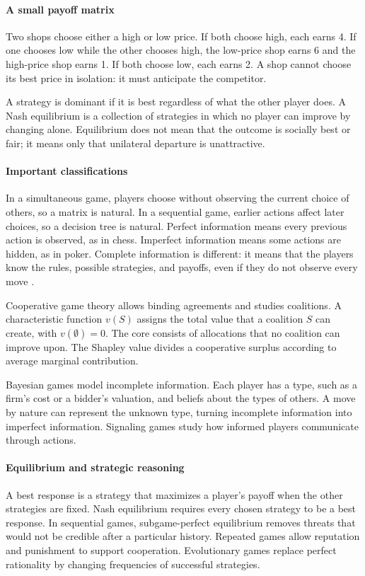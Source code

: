\paragraph{A small payoff matrix}
Two shops choose either a high or low price. If both choose high, each earns 4. If one chooses low while the other chooses high, the low-price shop earns 6 and the high-price shop earns 1. If both choose low, each earns 2. A shop cannot choose its best price in isolation: it must anticipate the competitor.

A strategy is dominant if it is best regardless of what the other player does. A Nash equilibrium is a collection of strategies in which no player can improve by changing alone. Equilibrium does not mean that the outcome is socially best or fair; it means only that unilateral departure is unattractive.

\paragraph{Important classifications}
In a simultaneous game, players choose without observing the current choice of others, so a matrix is natural. In a sequential game, earlier actions affect later choices, so a decision tree is natural. Perfect information means every previous action is observed, as in chess. Imperfect information means some actions are hidden, as in poker. Complete information is different: it means that the players know the rules, possible strategies, and payoffs, even if they do not observe every move \cite{game_theory_ref3}.

Cooperative game theory allows binding agreements and studies coalitions. A characteristic function $v(S)$ assigns the total value that a coalition $S$ can create, with $v(\emptyset)=0$. The core consists of allocations that no coalition can improve upon. The Shapley value divides a cooperative surplus according to average marginal contribution.

Bayesian games model incomplete information. Each player has a type, such as a firm's cost or a bidder's valuation, and beliefs about the types of others. A move by nature can represent the unknown type, turning incomplete information into imperfect information. Signaling games study how informed players communicate through actions.

\paragraph{Equilibrium and strategic reasoning}
A best response is a strategy that maximizes a player's payoff when the other strategies are fixed. Nash equilibrium requires every chosen strategy to be a best response. In sequential games, subgame-perfect equilibrium removes threats that would not be credible after a particular history. Repeated games allow reputation and punishment to support cooperation. Evolutionary games replace perfect rationality by changing frequencies of successful strategies.

